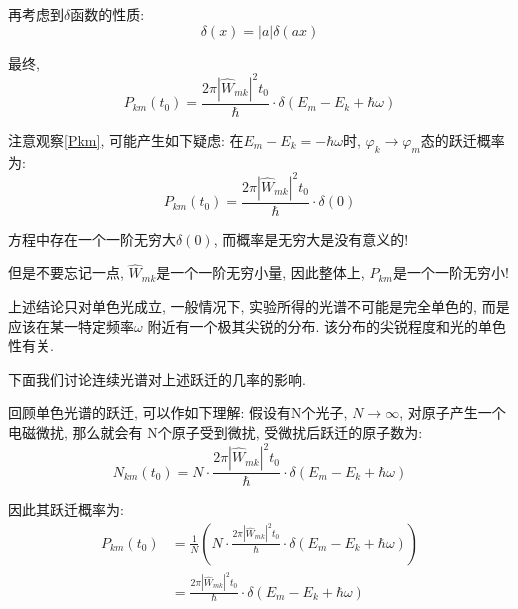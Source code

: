 \documentclass[a4paper, 11pt]{article}
\begin{document}
\begin{spacing}{1.2}
        再考虑到$\delta$函数的性质:
        \begin{equation}
          \delta(x) = |a|\delta(ax)
        \end{equation}

        最终,
        \begin{equation}
          \label{Pkm}
          P_{km}(t_0) = \frac{2\pi|\hat{W}_{mk}|^2t_0}{\hbar}
          \cdot\delta(E_m-E_k+\hbar\omega)
        \end{equation}
        
        注意观察\eqref{Pkm}, 可能产生如下疑虑: 在$E_m-E_k=-\hbar\omega$时, $\varphi_k\to 
        \varphi_m$态的跃迁概率
        为:
        \begin{equation}
          \label{sig_fin_P}
          P_{km}(t_0) = \frac{2\pi|\hat{W}_{mk}|^2t_0}{\hbar}\cdot\delta(0)
        \end{equation}

        方程中存在一个一阶无穷大$\delta(0)$, 而概率是无穷大是没有意义的!
        \par
        但是不要忘记一点, $\hat{W}_{mk}$是一个一阶无穷小量, 因此整体上, $P_{km}$是一个一阶无穷小!
        \par
        上述结论只对单色光成立, 一般情况下, 实验所得的光谱不可能是完全单色的, 而是应该在某一特定频率$\omega$
        附近有一个极其尖锐的分布. 该分布的尖锐程度和光的单色性有关. 
        \par
        下面我们讨论连续光谱对上述跃迁的几率的影响.
        \par
        回顾单色光谱的跃迁, 可以作如下理解: 假设有N个光子, $N\to\infty$, 对原子产生一个电磁微扰, 那么就会有
        N个原子受到微扰, 受微扰后跃迁的原子数为:
        \begin{equation}
          N_{km}(t_0) = N\cdot\frac{2\pi|\hat{W}_{mk}|^2t_0}{\hbar}
                         \cdot\delta(E_m-E_k+\hbar\omega)
        \end{equation}
        
        因此其跃迁概率为:
        \begin{equation}
          \label{content_P}
          \begin{aligned}
            P_{km}(t_0) &= \frac{1}{N}\left(N\cdot\frac{2\pi|\hat{W}_{mk}|^2t_0}{\hbar}
                           \cdot\delta(E_m-E_k+\hbar\omega)\right)\\
                        &= \frac{2\pi|\hat{W}_{mk}|^2t_0}{\hbar}
                           \cdot\delta(E_m-E_k+\hbar\omega)
          \end{aligned}
        \end{equation}
      

\end{spacing}
\end{document}
